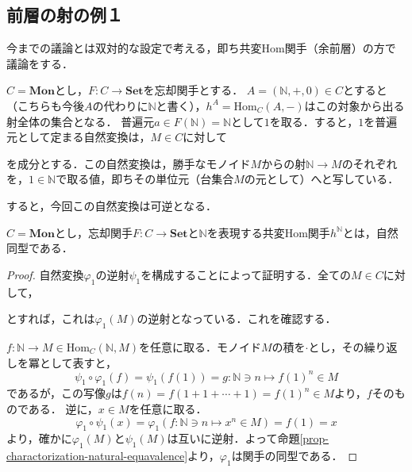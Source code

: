 \documentclass[uplatex, 12pt, dvipdfmx]{jsreport}
\begin{document}
\subsection{前層の射の例１}
今までの議論とは双対的な設定で考える，即ち共変Hom関手（余前層）の方で議論をする．

$C=\mathbf{Mon}$とし，$F:C\to\mathbf{Set}$を忘却関手とする．
$A=(\mathbb{N},+,0)\in C$とすると（こちらも今後$A$の代わりに$\mathbb{N}$と書く），$h^A=\mathrm{Hom}_C(A,-)$はこの対象から出る射全体の集合となる．
普遍元$a\in F(\mathbb{N})=\mathbb{N}$として$1$を取る．すると，$1$を普遍元として定まる自然変換は，$M\in C$に対して
\begin{center}\end{center}
を成分とする．この自然変換は，勝手なモノイド$M$からの射$\mathbb{N}\to M$のそれぞれを，$1\in\mathbb{N}$で取る値，即ちその単位元（台集合$M$の元として）へと写している．

すると，今回この自然変換は可逆となる．
\begin{proposition}\rm{}
    $C=\mathbf{Mon}$とし，忘却関手$F:C\to\mathbf{Set}$と$\mathbb{N}$を表現する共変Hom関手$h^\mathbb{N}$とは，自然同型である．
\end{proposition}
\begin{proof}
    自然変換$\varphi_1$の逆射$\psi_1$を構成することによって証明する．全ての$M\in C$に対して，
    \begin{center}\end{center}
    とすれば，これは$\varphi_1(M)$の逆射となっている．これを確認する．

    $f:\mathbb{N}\to M　\in\mathrm{Hom}_C(\mathbb{N},M)$を任意に取る．モノイド$M$の積を$\cdot$とし，その繰り返しを冪として表すと，
    $$\psi_1\circ\varphi_1(f)=\psi_1(f(1))=g:\mathbb{N}\ni n \mapsto f(1)^n \in M$$
    であるが，この写像$g$は$f(n)=f(1+1+\cdots +1)=f(1)^n\in M$より，$f$そのものである．
    逆に，$x\in M$を任意に取る．
    $$\varphi_1\circ\psi_1(x)=\varphi_1(f:\mathbb{N}\ni n\mapsto x^n\in M)=f(1)=x$$
    より，確かに$\varphi_1(M)$と$\psi_1(M)$は互いに逆射．よって命題\ref{prop-charactorization-natural-equavalence}より，$\varphi_1$は関手の同型である．
\end{proof}
\end{document}
